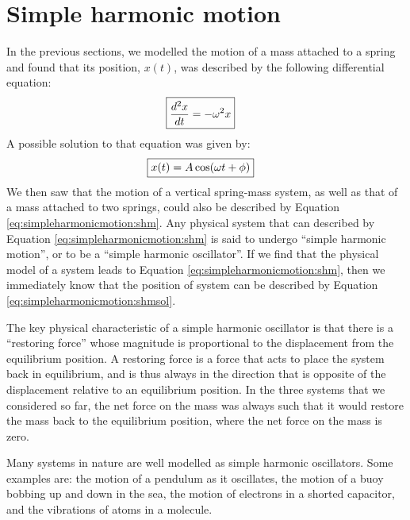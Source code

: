 \section{Simple harmonic motion}
In the previous sections, we modelled the motion of a mass attached to a spring and found that its position, $x(t)$, was described by the following differential equation:
\begin{align}
\label{eq:simpleharmonicmotion:shm}
\Aboxed{\frac{d^2x}{dt} &= -\omega^2x}
\end{align}
A possible solution to that equation was given by:
\begin{align}
\label{eq:simpleharmonicmotion:shmsol}
\Aboxed{x(t) = A\cos(\omega t+ \phi)}
\end{align}
We then saw that the motion of a vertical spring-mass system, as well as that of a mass attached to two springs, could also be described by Equation \ref{eq:simpleharmonicmotion:shm}. Any physical system that can described by Equation \ref{eq:simpleharmonicmotion:shm} is said to undergo ``simple harmonic motion'', or to be a ``simple harmonic oscillator''. If we find that the physical model of a system leads to Equation \ref{eq:simpleharmonicmotion:shm}, then we immediately know that the position of system can be described by Equation \ref{eq:simpleharmonicmotion:shmsol}.

The key physical characteristic of a simple harmonic oscillator is that there is a ``restoring force'' whose magnitude is proportional to the displacement from the equilibrium position. A restoring force is a force that acts to place the system back in equilibrium, and is thus always in the direction that is opposite of the displacement relative to an equilibrium position. In the three systems that we considered so far, the net force on the mass was always such that it would restore the mass back to the equilibrium position, where the net force on the mass is zero.

Many systems in nature are well modelled as simple harmonic oscillators. Some examples are: the motion of a pendulum as it oscillates, the motion of a buoy bobbing up and down in the sea, the motion of electrons in a shorted capacitor, and the vibrations of atoms in a molecule.

